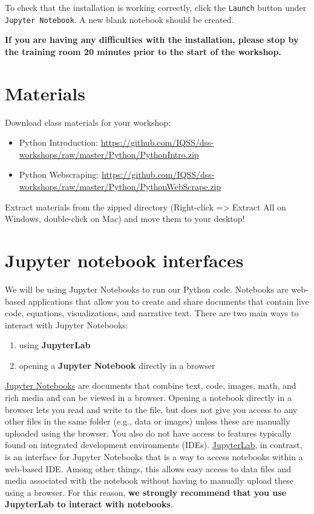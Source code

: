 \documentclass[
]{book}
\providecommand{\tightlist}{%
  \setlength{\itemsep}{0pt}\setlength{\parskip}{0pt}}
\begin{document}
To check that the installation is working correctly, click the \texttt{Launch} button under \texttt{Jupyter\ Notebook}. A new blank notebook should be created.

\textbf{If you are having any difficulties with the installation, please stop by the training room 20 minutes prior to the start of the workshop.}

\hypertarget{materials-1}{%
\section{Materials}\label{materials-1}}

Download class materials for your workshop:

\begin{itemize}
\tightlist
\item
  Python Introduction: \url{https://github.com/IQSS/dss-workshops/raw/master/Python/PythonIntro.zip}
\item
  Python Webscraping: \url{https://github.com/IQSS/dss-workshops/raw/master/Python/PythonWebScrape.zip}
\end{itemize}

Extract materials from the zipped directory (Right-click =\textgreater{} Extract All on Windows, double-click on Mac) and move them to your desktop!

\hypertarget{jupyter-notebook-interfaces}{%
\section{Jupyter notebook interfaces}\label{jupyter-notebook-interfaces}}

We will be using Jupyter Notebooks to run our Python code. Notebooks are web-based applications that allow you to create and share documents that contain live code, equations, visualizations, and narrative text. There are two main ways to interact with Jupyter Notebooks:

\begin{enumerate}
\def\labelenumi{\arabic{enumi}.}
\tightlist
\item
  using \textbf{JupyterLab}
\item
  opening a \textbf{Jupyter Notebook} directly in a browser
\end{enumerate}

\href{https://jupyter-notebook.readthedocs.io/en/stable/}{Jupyter Notebooks} are documents that combine text, code, images, math, and rich media and can be viewed in a browser. Opening a notebook directly in a browser lets you read and write to the file, but does not give you access to any other files in the same folder (e.g., data or images) unless these are manually uploaded using the browser. You also do not have access to features typically found on integrated development environments (IDEs). \href{https://jupyterlab.readthedocs.io/en/stable/}{JupyterLab}, in contrast, is an interface for Jupyter Notebooks that is a way to access notebooks within a web-based IDE. Among other things, this allows easy access to data files and media associated with the notebook without having to manually upload these using a browser. For this reason, \textbf{we strongly recommend that you use JupyterLab to interact with notebooks}.
\end{document}
